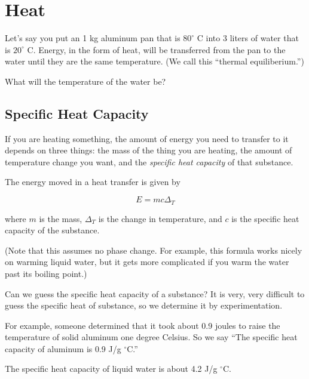 \chapter{Heat}

Let's say you put an 1 kg aluminum pan that is $80^\circ$ C into
3 liters of water that is $20^\circ$ C. Energy, in the form of heat,
will be transferred from the pan to the water until they are the same
temperature. (We call this ``thermal equiliberium.'')

What will the temperature of the water be?

\section{Specific Heat Capacity}

If you are heating something, the amount of energy you need to
transfer to it depends on three things: the mass of the thing you are
heating, the amount of temperature change you want, and the
\textit{specific heat capacity} of that substance.

\begin{mdframed}[style=important, frametitle={Energy in Heat Transfer}]

  The energy moved in a heat transfer is given by

  $$E = m c \Delta_T$$

  where $m$ is the mass, $\Delta_T$ is the change in temperature, and
  $c$ is the specific heat capacity of the substance.

  (Note that this
  assumes no phase change. For example, this formula works nicely on
  warming liquid water, but it gets more complicated if you warm the
  water past its boiling point.)

\end{mdframed}

Can we guess the specific heat capacity of a substance? It is very,
very difficult to guess the specific heat of substance, so we determine
it by experimentation.

For example, someone determined that it took about 0.9 joules to raise
the temperature of solid aluminum one degree Celsius. So we say ``The
specific heat capacity of aluminum is 0.9 J/g $^\circ$C.''

The specific heat capacity of liquid water is about 4.2 J/g $^\circ$C.

